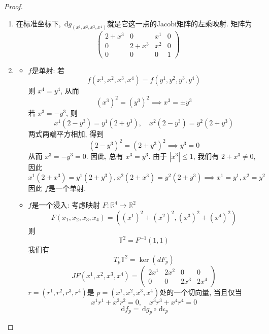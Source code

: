 \documentclass[../main.tex]{subfiles}
\begin{document}
\begin{proof}
  \begin{enumerate}
    \item 在标准坐标下,  \(  \,\mathrm{d} g_{\left( x^{1},x^{2},x^{3},x^{4} \right) }  \)就是它这一点的Jacobi矩阵的左乘映射. 矩阵为 \[
    \begin{pmatrix} 
        2+ x^{3}&0&x^{1}&0\\ 
         0&2+ x^{3}& x^{2}&0\\ 
          0&0&0&1
    \end{pmatrix} 
    \] 
    \item 
    \begin{itemize}
      \item  \(  f  \)是单射:  若 \[
      f\left( x^{1},x^{2},x^{3},x^{4} \right)= f\left( y^{1},y^{2},y^{3},y^{4} \right)  
      \]则 \(  x^{4}= y^{4}  \), 从而  \[
    \left( x^{3} \right)^{2}= \left( y^{3} \right)^{2}\implies x^{3}= \pm y^{3}  
      \] 若 \(  x^{3}= -y^{3}  \), 则 \[
      x^{1}\left( 2-y^{3} \right)= y^{1}\left( 2+ y^{3} \right),\quad x^{2}\left( 2-y^{3} \right)= y^{2}\left( 2+ y^{3} \right)    
      \] 两式两端平方相加, 得到 \[
      \left( 2-y^{3} \right)^{2}= \left( 2+ y^{3} \right)^{2}\implies y^{3}= 0
      \]从而 \(  x^{3}= -y^{3}= 0  \). 因此, 总有 \(  x^{3}= y^{3}  \).  
      由于 \(  \left| x^{3} \right|\le 1   \), 我们有 \(  2+ x^{3}\neq 0  \), 因此 \[
      x^{1}\left( 2+ x^{3} \right)= y^{1}\left( 2+ y^{3} \right), x^{2}\left( 2+ x^{3} \right)= y^{2}\left( 2+ y^{3} \right)\implies x^{1}= y^{1}, x^{2}= y^{2}    
      \]  因此 \(  f  \)是一个单射.
      \item \(  f  \)是一个浸入:    考虑映射 \(  F: \mathbb{R} ^{4}\to \mathbb{R} ^{2}  \) \[
    F\left( x_1,x_2,x_3,x_4 \right)= \left( \left( x^{1} \right)^{2}+ \left( x^{2} \right)^{2}, \left( x^{3} \right)^{2}+ \left( x^{4} \right)^{2}     \right)  
    \] 则 \[
    \mathbb{T}^{2}= F^{-1} \left( 1,1 \right) 
    \] 我们有  \[
    T_{p}\mathbb{T}^{2}=  \operatorname{ker} \left( d F_{p} \right) 
    \] \[
    JF\left( x^{1},x^{2},x^{3},x^{4} \right) = \begin{pmatrix} 
        2x^{1}&2x^{2} &0&0\\ 
         0&0&2x^{3}&2x^{4} 
    \end{pmatrix} 
    \] \(  r= \left( r^{1}, r^{2},r^{3},r^{4} \right)   \)是  \( p= \left( x^{1},x^{2},x^{3},x^{4} \right)   \)处的一个切向量, 当且仅当     \[
    x^{1}r^{1}+ x^{2}r^{2}= 0,\quad x^{3}r^{3}+ x^{4}r^{4}= 0
    \] \[
    \,\mathrm{d} f_{p}=  \,\mathrm{d} g_{p}\circ \,\mathrm{d} \iota _{p}
\]
\end{itemize}
\end{enumerate}
\end{proof}
\end{document}
